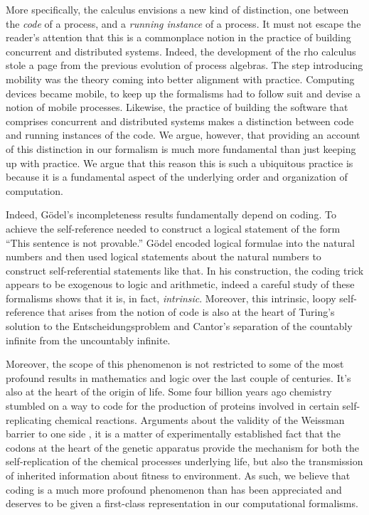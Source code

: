 More specifically, the calculus envisions a new kind of distinction,
one between the \emph{code} of a process, and a \emph{running
instance} of a process. It must not escape the reader's attention that
this is a commonplace notion in the practice of building concurrent
and distributed systems. Indeed, the development of the rho calculus
stole a page from the previous evolution of process algebras. The step
introducing mobility was the theory coming into better alignment with
practice. Computing devices became mobile, to keep up the formalisms
had to follow suit and devise a notion of mobile processes. Likewise,
the practice of building the software that comprises concurrent and
distributed systems makes a distinction between code and running
instances of the code. We argue, however, that providing an account of
this distinction in our formalism is much more fundamental than just
keeping up with practice. We argue that this reason this is such a
ubiquitous practice is because it is a fundamental aspect of the
underlying order and organization of computation.

Indeed, G\"odel's incompleteness results fundamentally depend on
coding. To achieve the self-reference needed to construct a logical
statement of the form ``This sentence is not provable.'' G\"odel
encoded logical formulae into the natural numbers and then used
logical statements about the natural numbers to construct
self-referential statements like that. In his construction, the coding
trick appears to be exogenous to logic and arithmetic, indeed a
careful study of these formalisms shows that it is, in fact,
\emph{intrinsic}. Moreover, this intrinsic, loopy self-reference that
arises from the notion of code is also at the heart of Turing's
solution to the Entscheidungsproblem and Cantor's separation of the
countably infinite from the uncountably infinite.

Moreover, the scope of this phenomenon is not restricted to some of
the most profound results in mathematics and logic over the last
couple of centuries. It's also at the heart of the origin of
life. Some four billion years ago chemistry stumbled on a way to code
for the production of proteins involved in certain self-replicating
chemical reactions. Arguments about the validity of the Weissman
barrier to one side \cite{William2018TheGA}, it is a matter of
experimentally established fact that the codons at the heart of the
genetic apparatus provide the mechanism for both the self-replication
of the chemical processes underlying life, but also the transmission
of inherited information about fitness to environment. As such, we
believe that coding is a much more profound phenomenon than has been
appreciated and deserves to be given a first-class representation in
our computational formalisms.

